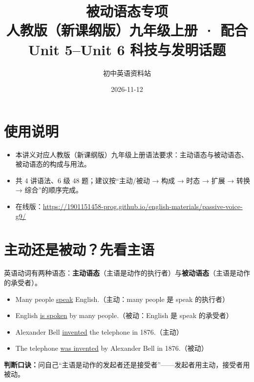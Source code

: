 \documentclass[11pt,a4paper]{ctexart}
\title{\textbf{被动语态专项}\\[4pt]
\large 人教版（新课纲版）九年级上册 · 配合 Unit 5--Unit 6 科技与发明话题}
\author{初中英语资料站}
\date{2026-11-12}
\begin{document}
\maketitle

\section*{使用说明}
\begin{itemize}[leftmargin=1.4em]
\item 本讲义对应人教版（新课纲版）九年级上册语法要求：主动语态与被动语态、被动语态的构成与用法。
\item 共 4 讲语法、6 级 48 题；建议按“主动/被动 → 构成 → 时态 → 扩展 → 转换 → 综合”的顺序完成。
\item 在线版：\url{https://1901151458-prog.github.io/english-materials/passive-voice-g9/}
\end{itemize}

\section{主动还是被动？先看主语}
英语动词有两种语态：\textbf{主动语态}（主语是动作的执行者）与\textbf{被动语态}（主语是动作的承受者）。
\begin{itemize}[leftmargin=1.4em]
\item Many people \underline{speak} English.（主动：many people 是 speak 的执行者）
\item English \underline{is spoken} by many people.（被动：English 是 speak 的承受者）
\item Alexander Bell \underline{invented} the telephone in 1876.（主动）
\item The telephone \underline{was invented} by Alexander Bell in 1876.（被动）
\end{itemize}
\textbf{判断口诀：}问自己“主语是动作的发起者还是接受者”——发起者用主动，接受者用被动。
\end{document}
